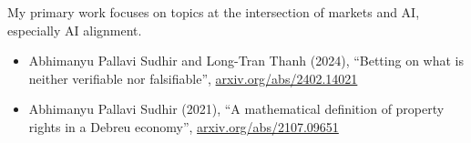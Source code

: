 \documentclass{article}
\begin{document}
My primary work focuses on topics at the intersection of markets and AI, especially AI alignment.

\begin{itemize}

    \item
          Abhimanyu Pallavi Sudhir and Long-Tran Thanh (2024), ``Betting on what is neither verifiable nor falsifiable'', \href{https://arxiv.org/abs/2402.14021}{arxiv.org/abs/2402.14021}

    \item
          Abhimanyu Pallavi Sudhir (2021),
          ``A mathematical definition of property rights in a Debreu economy'',
          \href{https://arxiv.org/abs/2107.09651}{arxiv.org/abs/2107.09651}

\end{itemize}
\end{document}
